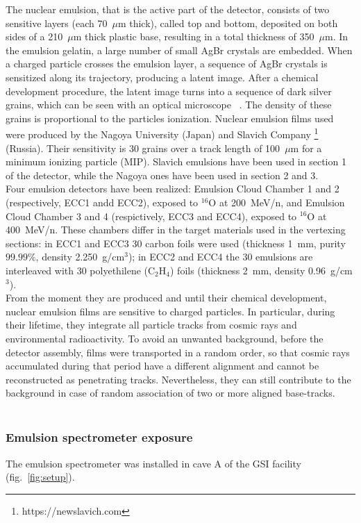 \documentclass[utf8]{frontiersFPHY} %
\begin{document}
The nuclear emulsion, that is the active part of the detector, consists of two sensitive layers (each 70~$\mu$m thick), called top and bottom, deposited on both sides of a 210~$\mu$m thick plastic base, resulting in a total thickness of 350~$\mu$m. In the emulsion gelatin, a large number of small AgBr crystals are embedded. When a charged particle crosses the emulsion layer, a sequence of AgBr crystals is sensitized along its trajectory, producing a latent image. After a chemical development procedure, the latent image turns into a sequence of dark silver grains, which can be seen with an optical microscope ~\cite{Alexandrov2015,Alexandrov2016,Alexandrov2017}. The density of these grains is proportional to the particles ionization. Nuclear emulsion films used were produced by the Nagoya University (Japan) and Slavich Company \footnote{https://newslavich.com} (Russia). Their sensitivity is 30 grains over a track length of 100~$\mu$m for a minimum ionizing particle (MIP). Slavich emulsions have been used in section 1 of the detector, while the Nagoya ones have been used in section 2 and 3. 
\\
Four emulsion detectors have been realized: Emulsion Cloud Chamber 1 and 2 (respectively, ECC1 andd ECC2), exposed to  $^{16}$O at 200~MeV/n, and Emulsion Cloud Chamber 3 and 4 (respictively, ECC3 and ECC4), exposed to $^{16}$O  at 400~MeV/n. These chambers differ in the target materials used in the vertexing sections: in ECC1 and ECC3 30 carbon foils were used (thickness 1~mm, purity $99.99\%$, density 2.250~g/cm$^{3}$); in ECC2 and ECC4 the 30 emulsions are interleaved with 30 polyethilene (C$_2$H$_4$) foils (thickness 2~mm, density 0.96~g/cm$^{3}$).
\\

From the moment they are produced and until their chemical development, nuclear emulsion films are sensitive to charged particles. In particular, during their lifetime,
they integrate all particle tracks from cosmic rays and environmental radioactivity. To avoid an unwanted background, before the detector assembly, films were transported
in a random order, so that cosmic rays accumulated during that period have a different alignment and cannot be reconstructed as penetrating tracks. Nevertheless, they can
still contribute to the background in case of random association of two or more aligned base-tracks.
\\
\\

%
\subsubsection{Emulsion spectrometer exposure}
The emulsion spectrometer was installed in cave A of the GSI facility (fig.~\ref{fig:setup}). 
\end{document}

